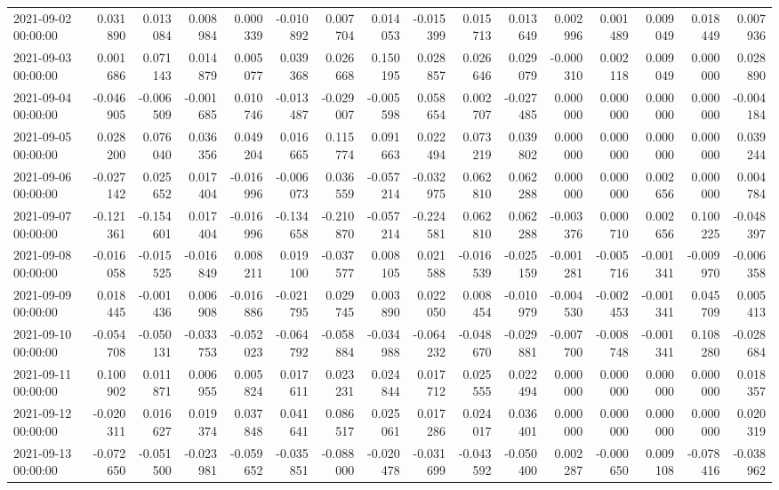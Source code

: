 \begin{tabular}{lrrrrrrrrrrrrrrr}
2021-09-02 00:00:00 & 0.031890 & 0.013084 & 0.008984 & 0.000339 & -0.010892 & 0.007704 & 0.014053 & -0.015399 & 0.015713 & 0.013649 & 0.002996 & 0.001489 & 0.009049 & 0.018449 & 0.007936 \\
2021-09-03 00:00:00 & 0.001686 & 0.071143 & 0.014879 & 0.005077 & 0.039368 & 0.026668 & 0.150195 & 0.028857 & 0.026646 & 0.029079 & -0.000310 & 0.002118 & 0.009049 & 0.000000 & 0.028890 \\
2021-09-04 00:00:00 & -0.046905 & -0.006509 & -0.001685 & 0.010746 & -0.013487 & -0.029007 & -0.005598 & 0.058654 & 0.002707 & -0.027485 & 0.000000 & 0.000000 & 0.000000 & 0.000000 & -0.004184 \\
2021-09-05 00:00:00 & 0.028200 & 0.076040 & 0.036356 & 0.049204 & 0.016665 & 0.115774 & 0.091663 & 0.022494 & 0.073219 & 0.039802 & 0.000000 & 0.000000 & 0.000000 & 0.000000 & 0.039244 \\
2021-09-06 00:00:00 & -0.027142 & 0.025652 & 0.017404 & -0.016996 & -0.006073 & 0.036559 & -0.057214 & -0.032975 & 0.062810 & 0.062288 & 0.000000 & 0.000000 & 0.002656 & 0.000000 & 0.004784 \\
2021-09-07 00:00:00 & -0.121361 & -0.154601 & 0.017404 & -0.016996 & -0.134658 & -0.210870 & -0.057214 & -0.224581 & 0.062810 & 0.062288 & -0.003376 & 0.000710 & 0.002656 & 0.100225 & -0.048397 \\
2021-09-08 00:00:00 & -0.016058 & -0.015525 & -0.016849 & 0.008211 & 0.019100 & -0.037577 & 0.008105 & 0.021588 & -0.016539 & -0.025159 & -0.001281 & -0.005716 & -0.001341 & -0.009970 & -0.006358 \\
2021-09-09 00:00:00 & 0.018445 & -0.001436 & 0.006908 & -0.016886 & -0.021795 & 0.029745 & 0.003890 & 0.022050 & 0.008454 & -0.010979 & -0.004530 & -0.002453 & -0.001341 & 0.045709 & 0.005413 \\
2021-09-10 00:00:00 & -0.054708 & -0.050131 & -0.033753 & -0.052023 & -0.064792 & -0.058884 & -0.034988 & -0.064232 & -0.048670 & -0.029881 & -0.007700 & -0.008748 & -0.001341 & 0.108280 & -0.028684 \\
2021-09-11 00:00:00 & 0.100902 & 0.011871 & 0.006955 & 0.005824 & 0.017611 & 0.023231 & 0.024844 & 0.017712 & 0.025555 & 0.022494 & 0.000000 & 0.000000 & 0.000000 & 0.000000 & 0.018357 \\
2021-09-12 00:00:00 & -0.020311 & 0.016627 & 0.019374 & 0.037848 & 0.041641 & 0.086517 & 0.025061 & 0.017286 & 0.024017 & 0.036401 & 0.000000 & 0.000000 & 0.000000 & 0.000000 & 0.020319 \\
2021-09-13 00:00:00 & -0.072650 & -0.051500 & -0.023981 & -0.059652 & -0.035851 & -0.088000 & -0.020478 & -0.031699 & -0.043592 & -0.050400 & 0.002287 & -0.000650 & 0.009108 & -0.078416 & -0.038962 \\

\end{tabular}
